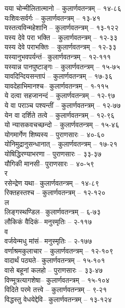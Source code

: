 \begin{raggedright}
\begin{parcolumns}[colwidths={1=.55\textwidth,2=.55\textwidth}]{2}
{यया चोन्मीलितात्मानो	– 	कुलार्णवतन्त्रम्  – १४-८६	\\
यःशिवःसर्वर्गः	–   कुलार्णवतन्त्रम्  – १३-४१\\
यस्तत्वविन्महेशानि	– 	कुलार्णवतन्त्रम्  – १३-१२२\\
यस्य देवे परा भक्ति	– 	कुलार्णवतन्त्रम्  – १२-३३\\
यस्य देवे पराभक्तिः	– 	कुलार्णवतन्त्रम्  – १२-३३\\
यस्यानुभवपर्यन्तं– 	कुलार्णवतन्त्रम्  – १२-१११\\
यस्यान्न पानपुष्टाङ्गः	– 	कुलार्णवतन्त्रम्  – १५-७५\\
यावदिन्दियसन्तापं	– 	कुलार्णवतन्त्रम्  – १७-३६	\\
यावदेहाभिमानश्च– 	कुलार्णवतन्त्रम्  – १-११५\\
ये दत्वा सहजानन्दं	– 	कुलार्णवतन्त्रम्  – १२-९७\\
ये वा पराञ्च पश्यन्तीं	– 	कुलार्णवतन्त्रम्  – १२-७७\\
येन वा दर्शिते तत्वे	– 	कुलार्णवतन्त्रम्  – १२-९६\\
यो न्यासकवचच्छन्दो	– 	कुलार्णवतन्त्रम्  – १५-४६\\
योगमार्गेण शिष्यस्य	– 	पुराणसारः   – ४०-६०	\\
योनिमुद्रानुसन्धानात्	– 	कुलार्णवतन्त्रम्  – १७-२१\\
योषिद्धिरण्याभरणा	– 	पुराणसारः   – ३३-३७	\\
यौगिकी मानसी– 	पुराणसारः   – ४०-५९\\
{\large र}\\
रसेन्द्रेण यथा– 	कुलार्णवतन्त्रम्  – १४-८९\\
रिक्तहस्तश्च	– 	कुलार्णवतन्त्रम्  – १२-१२०\\
{\large ल}\\
लिङ्गस्थण्डिल– 	कुलार्णवतन्त्रम्  – ६-७३\\
लौकिकं वैदिकं– 	मनुस्मृतिः  – २-११७\\
{\large व}\\
वर्जयेन्मधु मांसं– 	मनुस्मृतिः  – २-१७७\\
वर्णाश्रमकुलाचार	–   कुलार्णवतन्त्रम्  – १२-१०९\\
वादार्थं पठ्यते– 	कुलार्णवतन्त्रम्  – १५-१०१\\
वासे बहूनां कलहो	– 	पुराणसारः   – ३३-४७	\\
विण्मूत्रत्यागशेषा– 	कुलार्णवतन्त्रम्  – १५-१०४\\
विदिते परमे तत्त्वे	– 	कुलार्णवतन्त्रम्  – ९-२१\\
विद्धस्तु वेधयेद्देवि– 	कुलार्णवतन्त्रम्  – १३-१२४\\
}
\end{parcolumns}
\end{raggedright}
